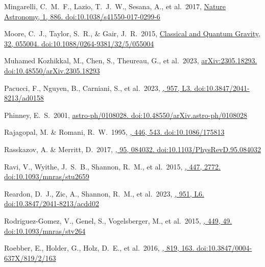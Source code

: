 \documentclass[twocolumn]{aastex631}
\begin{document}
\begin{thebibliography}{0}
Mingarelli, C.~M.~F., Lazio, T.~J.~W., Sesana, A., et al.\ 2017, 
\href{https://ui.adsabs.harvard.edu/abs/2017NatAs...1..886M}
{Nature Astronomy, 1, 886. doi:10.1038/s41550-017-0299-6}

Moore, C.~J., Taylor, S.~R., \& Gair, J.~R.\ 2015, 
\href{https://ui.adsabs.harvard.edu/abs/2015CQGra..32e5004M}
{Classical and Quantum Gravity, 32, 055004. doi:10.1088/0264-9381/32/5/055004}

Muhamed Kozhikkal, M., Chen, S., Theureau, G., et al.\ 2023, 
\href{https://ui.adsabs.harvard.edu/abs/2023arXiv230518293M}
{arXiv:2305.18293. doi:10.48550/arXiv.2305.18293}

Pacucci, F., Nguyen, B., Carniani, S., et al.\ 2023, 
\href{https://ui.adsabs.harvard.edu/abs/2023ApJ...957L...3P/exportcitation}
{\apjl, 957, L3. doi:10.3847/2041-8213/ad0158}

Phinney, E.~S.\ 2001,
\href{https://ui.adsabs.harvard.edu/abs/2001astro.ph..8028P}
{astro-ph/0108028. doi:10.48550/arXiv.astro-ph/0108028}

Rajagopal, M. \& Romani, R.~W.\ 1995, 
\href{https://ui.adsabs.harvard.edu/abs/1995ApJ...446..543R}
{\apj, 446, 543. doi:10.1086/175813}

Rasskazov, A. \& Merritt, D.\ 2017,
\href{https://ui.adsabs.harvard.edu/abs/2017PhRvD..95h4032R}
{\prd, 95, 084032. doi:10.1103/PhysRevD.95.084032}

Ravi, V., Wyithe, J.~S.~B., Shannon, R.~M., et al.\ 2015, 
\href{https://ui.adsabs.harvard.edu/abs/2015MNRAS.447.2772R}
{\mnras, 447, 2772. doi:10.1093/mnras/stu2659}

Reardon, D.~J., Zic, A., Shannon, R.~M., et al.\ 2023, 
\href{https://ui.adsabs.harvard.edu/abs/2023ApJ...951L...6R}
{\apjl, 951, L6. doi:10.3847/2041-8213/acdd02}

Rodriguez-Gomez, V., Genel, S., Vogelsberger, M., et al.\ 2015, 
\href{https://ui.adsabs.harvard.edu/abs/2015MNRAS.449...49R}
{\mnras, 449, 49. doi:10.1093/mnras/stv264}

Roebber, E., Holder, G., Holz, D.~E., et al.\ 2016, 
\href{https://ui.adsabs.harvard.edu/abs/2016ApJ...819..163R}
{\apj, 819, 163. doi:10.3847/0004-637X/819/2/163}


\end{thebibliography}
\end{document}

